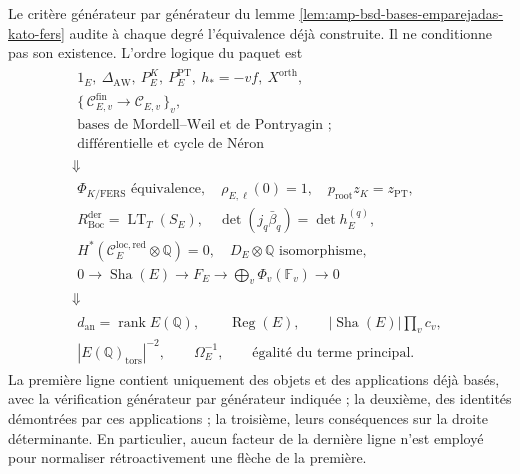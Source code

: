Le critère générateur par générateur du
lemme \ref{lem:amp-bsd-bases-emparejadas-kato-fers} audite à chaque degré
l'équivalence déjà construite. Il ne conditionne pas son existence. L'ordre logique
du paquet est
\begin{equation}\label{eq:amp-bsd-diagrama-causal}
\begin{array}{c}
 \begin{gathered}
  1_E,\ \Delta_{\mathrm{AW}},\ P_E^K,\ P_E^{\mathrm{PT}},
  \ h_*=-vf,\ X^{\mathrm{orth}},\\
  \{\,\mathcal C_{E,v}^{\mathrm{fin}}\to\mathcal C_{E,v}\,\}_v,\\
  \text{bases de Mordell--Weil et de Pontryagin ;}\\
  \text{différentielle et cycle de Néron}
 \end{gathered}
 \\[2mm]\Downarrow\\[-1mm]
 \begin{gathered}
  \Phi_{K/\mathrm{FERS}}\text{ équivalence},\quad
  \rho_{E,\ell}(0)=1,\quad
  p_{\mathrm{root}}z_K=z_{\mathrm{PT}},\\
  R_{\mathrm{Boc}}^{\mathrm{der}}=\operatorname{LT}_T(S_E),\quad
  \det(j_q\bar\beta_q)=\det h_E^{(q)},\\
  H^*(\mathcal C_E^{\mathrm{loc,red}}\otimes\mathbb Q)=0,\quad
  D_E\otimes\mathbb Q\text{ isomorphisme},\\
  0\to\operatorname{Sha}(E)\to F_E
  \to\bigoplus_v\Phi_v(\mathbb F_v)\to0
 \end{gathered}
 \\[2mm]\Downarrow\\[-1mm]
 \begin{gathered}
  d_{\mathrm{an}}=\operatorname{rank}E(\mathbb Q),\qquad
  \operatorname{Reg}(E),\qquad
  |\operatorname{Sha}(E)|\prod_vc_v,\\
  |E(\mathbb Q)_{\mathrm{tors}}|^{-2},\qquad
  \Omega_E^{-1},\qquad
  \text{égalité du terme principal}.
 \end{gathered}
\end{array}
\end{equation}
La première ligne contient uniquement des objets et des applications déjà basés, avec
la vérification générateur par générateur indiquée ; la deuxième, des identités
démontrées par ces applications ; la troisième, leurs conséquences sur la droite
déterminante. En particulier, aucun facteur de la dernière ligne n'est
employé pour normaliser rétroactivement une flèche de la première.

